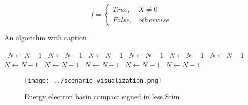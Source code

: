 \documentclass[a4paper]{article}
\begin{document}
\begin{equation}   f =
\begin{cases} True, & X \neq 0\\
False, & otherwise
\end{cases}
\end{equation}

\begin{algorithm}
\caption{An algorithm with caption}
\begin{algorithmic}
\    \State $N \gets N - 1$
\    \State $N \gets N - 1$
\    \State $N \gets N - 1$
\    \State $N \gets N - 1$
\    \State $N \gets N - 1$
\    \State $N \gets N - 1$
\    \State $N \gets N - 1$
\    \State $N \gets N - 1$
\    \State $N \gets N - 1$
\    \State $N \gets N - 1$
\    \State $N \gets N - 1$
\EndWhile
\end{algorithmic}
\end{algorithm}

\begin{figure}
\centering
\texttt{[image: ../scenario\_visualization.png]}
\caption{Energy electron basin compact signed in less Stim
}
\end{figure}
 
\end{document}
